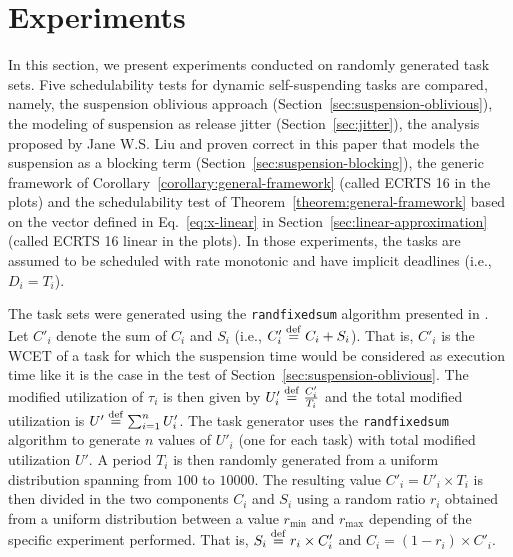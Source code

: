 \section{Experiments}
\label{sec:experiments}

In this section, we present experiments conducted on randomly generated task sets. Five schedulability tests for dynamic self-suspending tasks are compared, namely, the suspension oblivious approach (Section~\ref{sec:suspension-oblivious}), the modeling of suspension as release jitter (Section~\ref{sec:jitter}), the analysis proposed by Jane W.S. Liu and proven correct in this paper that models the suspension as a blocking term (Section~\ref{sec:suspension-blocking}), the generic framework of Corollary~\ref{corollary:general-framework} (called ECRTS 16 in the plots) and the schedulability test of Theorem~\ref{theorem:general-framework} based on the vector defined in Eq.~\eqref{eq:x-linear} in Section~\ref{sec:linear-approximation} (called ECRTS 16 linear in the plots). In those experiments, the tasks are assumed to be scheduled with rate monotonic and have implicit deadlines (i.e., $D_i = T_i$).

The task sets were generated using the \texttt{randfixedsum} algorithm presented in \cite{Emberson-taskSetGeneration-2010}. Let $C'_i$ denote the sum of $C_i$ and $S_i$ (i.e., $C'_i \stackrel{\mathrm{def}}{=} C_i + S_i$). That is, $C'_i$ is the WCET of a task for which the suspension time would be considered as execution time like it is the case in the test of Section~\ref{sec:suspension-oblivious}. The modified utilization of $\tau_i$ is then given by $U'_i \stackrel{\mathrm{def}}{=} \frac{C'_i}{T_i}$ and the total modified utilization is $U' \stackrel{\mathrm{def}}{=} \sum_{i=1}^n U'_i$. The task generator uses the \texttt{randfixedsum} algorithm to generate $n$ values of $U'_i$ (one for each task) with total modified utilization $U'$. A period $T_i$ is then randomly generated from a uniform distribution spanning from $100$ to $10000$. The resulting value $C'_i = U'_i \times T_i$ is then divided in the two components $C_i$ and $S_i$ using a random ratio $r_i$ obtained from a uniform distribution between a value $r_{\min}$ and $r_{\max}$ depending of the specific experiment performed. That is, $S_i \stackrel{\mathrm{def}}{=} r_i \times C'_i$ and $C_i = (1 - r_i) \times C'_i$. 

